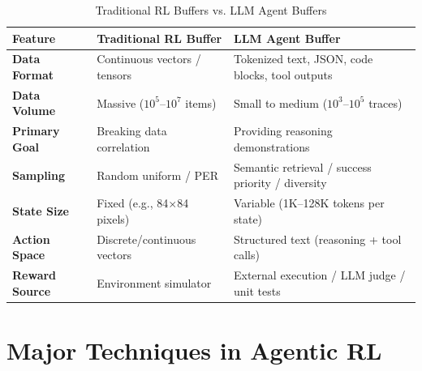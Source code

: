 \begin{table}[ht!]
\centering
\caption{Traditional RL Buffers vs. LLM Agent Buffers}
\begin{tabular}{@{}lp{5cm}p{8cm}@{}}
\toprule
\textbf{Feature} & \textbf{Traditional RL Buffer} & \textbf{LLM Agent Buffer} \\
\midrule
\textbf{Data Format} & Continuous vectors / tensors & Tokenized text, JSON, code blocks, tool outputs \\
\textbf{Data Volume} & Massive ($10^5$--$10^7$ items) & Small to medium ($10^3$--$10^5$ traces) \\
\textbf{Primary Goal} & Breaking data correlation & Providing reasoning demonstrations \\
\textbf{Sampling} & Random uniform / PER & Semantic retrieval / success priority / diversity \\
\textbf{State Size} & Fixed (e.g., 84$\times$84 pixels) & Variable (1K--128K tokens per state) \\
\textbf{Action Space} & Discrete/continuous vectors & Structured text (reasoning + tool calls) \\
\textbf{Reward Source} & Environment simulator & External execution / LLM judge / unit tests \\
\bottomrule
\end{tabular}
\end{table}

\section{Major Techniques in Agentic RL}
\label{major-techniques-in-agentic-rl}


